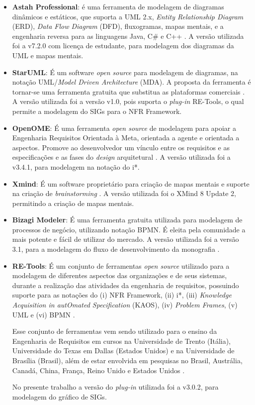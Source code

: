 \begin{itemize}
	\item \textbf{Astah Professional}: é uma ferramenta de modelagem de diagramas dinâmicos e estáticos, que suporta a UML 2.x, \textit{Entity Relationship Diagram} (ERD), \textit{Data Flow Diagram} (DFD), fluxogramas, mapas mentais, e a engenharia reversa para as linguagens Java, C\# e C++ \cite{astah}. A versão utilizada foi a v7.2.0 com licença de estudante, para modelagem dos diagramas da UML e mapas mentais.   
	
	\item \textbf{StarUML}: É um software \textit{open source} para modelagem de diagramas, na notação UML/\textit{Model Driven Architecture} (MDA). A proposta da ferramenta é tornar-se uma ferramenta gratuita que substitua as plataformas comerciais \cite{starUML}. A versão utilizada foi a versão v1.0, pois suporta o \textit{plug-in} RE-Tools, o qual permite a modelagem do SIGs para o NFR Framework. 
	
	\item \textbf{OpenOME}: É uma ferramenta \textit{open source} de modelagem para apoiar a Engenharia Requisitos Orientada à Meta, orientada a agente e orientada a aspectos. Promove ao desenvolvedor um vínculo entre os requisitos e as especificações e as fases do \textit{design} arquitetural \cite{openOME}. A versão utilizada foi a v3.4.1, para modelagem na notação do i*. 
	
	\item \textbf{Xmind}: É um software proprietário para criação de mapas mentais e suporte na criação de \textit{brainstorming} \cite{xMind}. A versão utilizada foi o XMind 8 Update 2, permitindo a criação de mapas mentais. 
	
	\item \textbf{Bizagi Modeler}: É uma ferramenta gratuita utilizada para modelagem de processos de negócio, utilizando notação BPMN. É eleita pela comunidade a mais potente e fácil de utilizar do mercado. A versão utilizada foi a versão 3.1, para a modelagem do fluxo de desenvolvimento da monografia \cite{bizagi}. 
	
	\item \textbf{RE-Tools}: É um conjunto de ferramentas \textit{open source} utilizado para a modelagem de diferentes aspectos das organizações e de seus sistemas, durante a realização das atividades da engenharia de requisitos, possuindo suporte para as notações do (i) NFR Framework, (ii) i*, (iii) \textit{Knowledge Acquisition in autOmated Specification} (KAOS), (iv) \textit{Problem Frames}, (v) UML e (vi) BPMN \cite{reTools} \cite{supakkul2012re}.
	
	Esse conjunto de ferramentas vem sendo utilizado para o ensino da Engenharia de Requisitos em cursos na Universidade de Trento (Itália), Universidade do Texas em Dallas (Estados Unidos) e na Universidade de Brasília (Brasil), além de estar envolvida em pesquisas no Brasil, Austrália, Canadá, China, França, Reino Unido e Estados Unidos \cite{supakkul2012re}. 
	
	No presente trabalho a versão do \textit{plug-in} utilizada foi a v3.0.2, para modelagem do gráfico de SIGs. 
\end{itemize}

